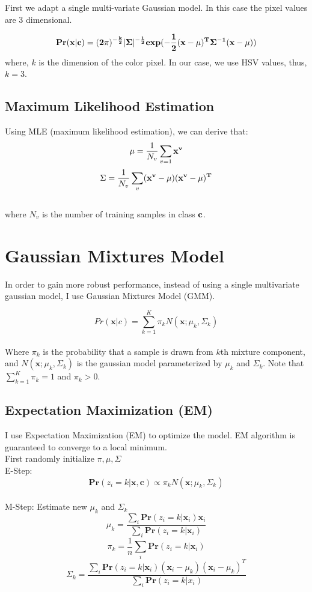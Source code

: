 \documentclass[english]{article}
\newcommand{\mb}{\mathbf }
\begin{document}
First we adapt a single multi-variate Gaussian model. In this case the pixel values are 3 dimensional.

\begin{align*}
\bf{
Pr( x| c) = (2\pi)^{-\frac{k}{2}} |\Sigma| ^ {-\frac{1}{2}} exp( -\frac{1}{2} (x - \mu)^T \Sigma ^{-1} (x - \mu))
}
\end{align*}
where, $k$ is the dimension of the color pixel. In our case, we use HSV values, thus, $k=3$. \\
\subsection*{Maximum Likelihood Estimation}
Using MLE (maximum likelihood estimation), we can derive that: \\
\[
	\mu = \frac{1}{N_v} \sum_{v=1} \bf{x^v}\\
\]
\[
	\Sigma = \frac{1}{N_v} \sum_v (\bf{x^v} - \mu)(\bf{x^v} - \mu)^T
\]
\\
where $N_v$ is the number of training samples in class $\bf{c}$.



\section {Gaussian Mixtures Model}
In order to gain more robust performance, instead of using a single multivariate gaussian model, I use Gaussian Mixtures Model (GMM).

\[
Pr(\mb{x}|c) = \sum_{k=1}^K \pi_k N(\mb{x} ; \mu_k, \Sigma_k)
\]
\\
Where $\pi_k$ is the probability that a sample is drawn from $k$th mixture component, and $N(\mb{x};\mu_k, \Sigma_k)$ is the gaussian model parameterized by $\mu_k$ and $\Sigma_k$.  Note that $\sum_{k=1}^K \pi_k = 1$ and $\pi_k > 0$. 

\subsection*{Expectation Maximization (EM)}
I use Expectation Maximization (EM) to optimize the model. EM algorithm is guaranteed to converge to a local minimum.\\
First randomly initialize $\pi, \mu, \Sigma$ \\
E-Step: 
\[
	\mb{Pr}(z_i = k | \mb{x}, \mb{c})  \propto  \pi_k N(\mb{x}; \mu_k, \Sigma_k)
\]
\\
M-Step: Estimate new $\mu_k$ and $\Sigma_k$
 \[
 	\mu_k = \frac{\sum_i \mb{Pr}(z_i = k | \mb{x}_i ) \mb{x}_i}{ \sum_i \mb{Pr}(z_i = k | \mb{x}_i ) }
 \]
\[
	\pi_k = \frac{1}{n} \sum_i \mb{Pr}(z_i = k | \mb{x}_i ) 
\]
\[
	\Sigma_k = \frac{ \sum_i \mb{Pr}(z_i = k | \mb{x}_i) (\mb{x}_i - \mu_k) (\mb{x}_i - \mu_k)^T } {\sum_i \mb{Pr}(z_i = k | x_i) }
\]
\end{document}
